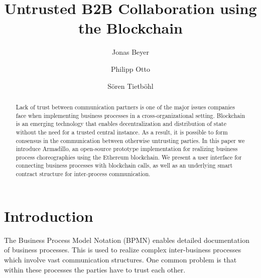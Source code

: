 \documentclass[runningheads]{llncs}
\begin{document}
%
\title{Untrusted B2B Collaboration using the Blockchain}
%
%
\author{Jonas Beyer \and Philipp Otto \and S\"oren Tietb\"ohl}
%
%
%
\maketitle %
%
\begin{abstract}
Lack of trust between communication partners is one of the major issues companies face when implementing business processes in a cross-organizational setting.
Blockchain is an emerging technology that enables decentralization and distribution of state without the need for a trusted central instance.
As a result, it is possible to form consensus in the communication between otherwise untrusting parties.
In this paper we introduce Armadillo, an open-source prototype implementation for realizing business process choreographies using the Ethereum blockchain.
We present a user interface for connecting business processes with blockchain calls, as well as an underlying smart contract structure for inter-process communication.

\end{abstract}
%
%
%
\section{Introduction}





The Business Process Model Notation (BPMN) enables detailed documentation of business processes. This is used to realize complex inter-business processes which involve vast communication structures. One common problem is that within these processes the parties have to trust each other.
\end{document}
